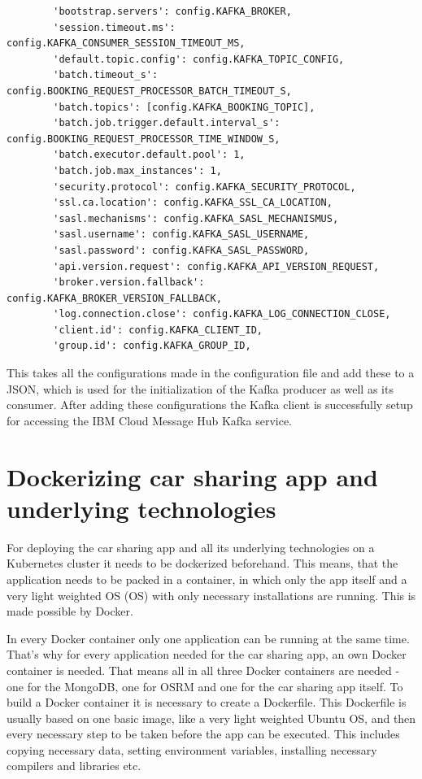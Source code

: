 \begin{lstlisting}
        'bootstrap.servers': config.KAFKA_BROKER,
        'session.timeout.ms': config.KAFKA_CONSUMER_SESSION_TIMEOUT_MS,
        'default.topic.config': config.KAFKA_TOPIC_CONFIG,
        'batch.timeout_s': config.BOOKING_REQUEST_PROCESSOR_BATCH_TIMEOUT_S,
        'batch.topics': [config.KAFKA_BOOKING_TOPIC],
        'batch.job.trigger.default.interval_s': config.BOOKING_REQUEST_PROCESSOR_TIME_WINDOW_S,
        'batch.executor.default.pool': 1,
        'batch.job.max_instances': 1,
        'security.protocol': config.KAFKA_SECURITY_PROTOCOL,
        'ssl.ca.location': config.KAFKA_SSL_CA_LOCATION,
        'sasl.mechanisms': config.KAFKA_SASL_MECHANISMUS,
        'sasl.username': config.KAFKA_SASL_USERNAME,
        'sasl.password': config.KAFKA_SASL_PASSWORD,
        'api.version.request': config.KAFKA_API_VERSION_REQUEST,
        'broker.version.fallback': config.KAFKA_BROKER_VERSION_FALLBACK,
        'log.connection.close': config.KAFKA_LOG_CONNECTION_CLOSE,
        'client.id': config.KAFKA_CLIENT_ID,
        'group.id': config.KAFKA_GROUP_ID,
\end{lstlisting}

This takes all the configurations made in the configuration file and add these to a JSON, which is used for the initialization of the Kafka producer as well as its consumer. After adding these configurations the Kafka client is successfully setup for accessing the IBM Cloud Message Hub Kafka service.

\section{Dockerizing car sharing app and underlying technologies}

For deploying the car sharing app and all its underlying technologies on a Kubernetes cluster it needs to be dockerized beforehand. This means, that the application needs to be packed in a container, in which only the app itself and a very light weighted \acs{OS} (\acl{OS}) with only necessary installations are running. This is made possible by Docker.

In every Docker container only one application can be running at the same time. That's why for every application needed for the car sharing app, an own Docker container is needed. That means all in all three Docker containers are needed - one for the MongoDB, one for OSRM and one for the car sharing app itself. 
To build a Docker container it is necessary to create a Dockerfile. This Dockerfile is usually based on one basic image, like a very light weighted Ubuntu OS, and then every necessary step to be taken before the app can be executed. This includes copying necessary data, setting environment variables, installing necessary compilers and libraries etc. 

